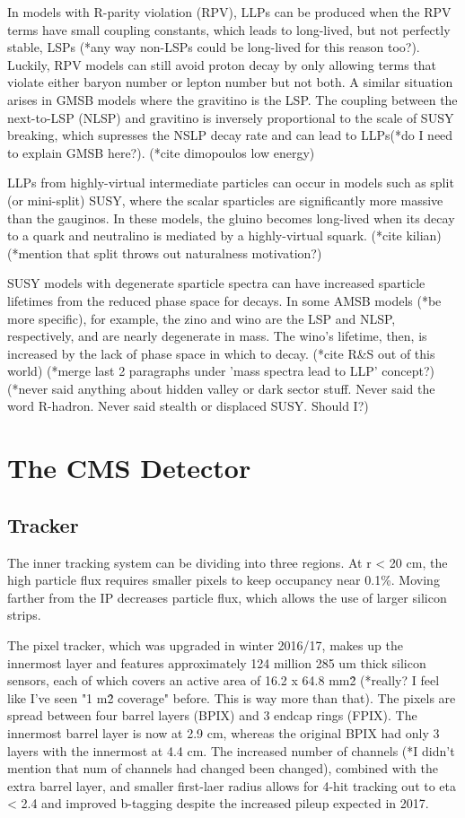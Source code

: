\documentclass[12pt]{article}
\begin{document}
    In models with R-parity violation (RPV), LLPs can be produced when the RPV terms have small coupling constants, which leads to long-lived, but not perfectly stable, LSPs (*any way non-LSPs could be long-lived for this reason too?). Luckily, RPV models can still avoid proton decay by only allowing terms that violate either baryon number or lepton number but not both. A similar situation arises in GMSB models where the gravitino is the LSP. The coupling between the next-to-LSP (NLSP) and gravitino is inversely proportional to the scale of SUSY breaking, which supresses the NSLP decay rate and can lead to LLPs(*do I need to explain GMSB here?). (*cite dimopoulos low energy)

    LLPs from highly-virtual intermediate particles can occur in models such as split (or mini-split) SUSY, where the scalar sparticles are significantly more massive than the gauginos. In these models, the gluino becomes long-lived when its decay to a quark and neutralino is mediated by a highly-virtual squark. (*cite kilian) (*mention that split throws out naturalness motivation?)

    SUSY models with degenerate sparticle spectra can have increased sparticle lifetimes from the reduced phase space for decays. In some AMSB models (*be more specific), for example, the zino and wino are the LSP and NLSP, respectively, and are nearly degenerate in mass. The wino's lifetime, then, is increased by the lack of phase space in which to decay. (*cite R\&S out of this world)
    (*merge last 2 paragraphs under 'mass spectra lead to LLP' concept?)
    (*never said anything about hidden valley or dark sector stuff. Never said the word R-hadron. Never said stealth or displaced SUSY. Should I?)

\section{The CMS Detector}
\subsection{Tracker}
    The inner tracking system can be dividing into three regions. At r < 20 cm, the high particle flux requires smaller pixels to keep occupancy near 0.1\%. Moving farther from the IP decreases particle flux, which allows the use of larger silicon strips.

    The pixel tracker, which was upgraded in winter 2016/17, makes up the innermost layer and features approximately 124 million 285 um thick silicon sensors, each of which covers an active area of 16.2 x 64.8 mm\^2 (*really? I feel like I've seen "1 m\^2 coverage" before. This is way more than that). The pixels are spread between four barrel layers (BPIX) and 3 endcap rings (FPIX). The innermost barrel layer is now at 2.9 cm, whereas the original BPIX had only 3 layers with the innermost at 4.4 cm. The increased number of channels (*I didn't mention that num of channels had changed been changed), combined with the extra barrel layer, and smaller first-laer radius allows for 4-hit tracking out to eta < 2.4 and improved b-tagging despite the increased pileup expected in 2017.
\end{document}

